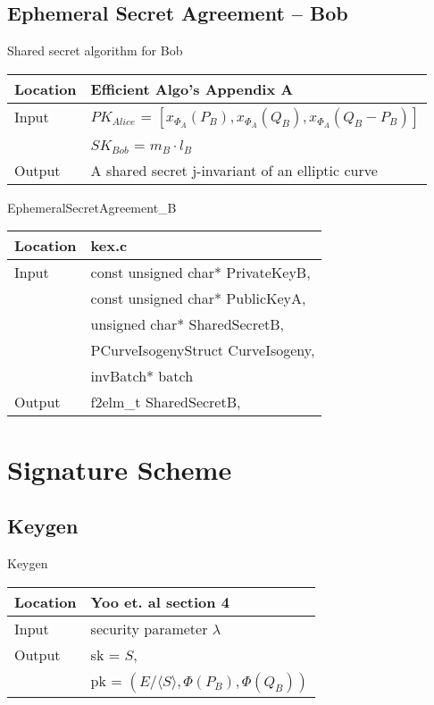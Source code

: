 \documentclass[10pt]{article}
\begin{document}
\subsection{Ephemeral Secret Agreement -- Bob}

	\parbox[t]{.35\linewidth}{
	\centering
	Shared secret algorithm for Bob
	\begin{tabular}{@{}ll@{}}
		\toprule
		Location & Efficient Algo's Appendix A \\
		\midrule
		Input & $PK_{Alice}$ = $[x_{\Phi_{A}}(P_{B}), x_{\Phi_{A}}(Q_{B}), x_{\Phi_{A}}(Q_{B} - P_{B})]$\\
		& $SK_{Bob}$ = $m_{B} \cdot l_{B}$\\
		\midrule
		Output & A shared secret j-invariant of an elliptic curve\\
		\bottomrule
	\end{tabular}}
	\hfill
	\parbox[t]{.35\linewidth}{
	\centering
	EphemeralSecretAgreement\_B
	\begin{tabular}{@{}ll@{}}
		\toprule
		Location & kex.c \\
		\midrule
		Input & const unsigned char* PrivateKeyB,\\
		& const unsigned char* PublicKeyA,\\
		& unsigned char* SharedSecretB,\\
		& PCurveIsogenyStruct CurveIsogeny,\\
		& invBatch* batch\\
		\midrule
		Output & f2elm\_t SharedSecretB,\\
		\bottomrule
	\end{tabular}}

\section{Signature Scheme}

\subsection{Keygen}

\parbox{\linewidth}{
\centering
Keygen
\begin{tabular}{@{}ll@{}}
	\toprule
	Location & Yoo et. al section 4 \\
	\midrule
	Input & security parameter $\lambda$\\
	\midrule
	Output & sk = $S$,\\
	& pk = $(E/\langle S \rangle, \Phi(P_B), \Phi(Q_B))$\\
	\bottomrule
\end{tabular}}
\hfill
\end{document}
